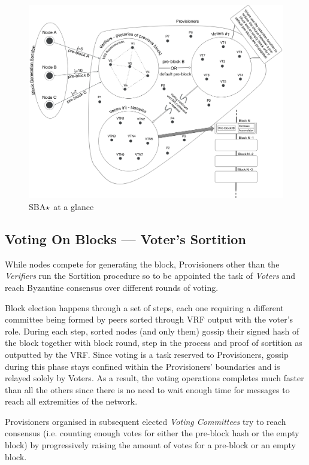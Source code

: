 \begin{figure}
\includegraphics[scale=0.2]{sba}
\caption{SBA$\large\star$ at a glance}
\end{figure}

\subsection{Voting On Blocks --- Voter's Sortition}

While nodes compete for generating the block, Provisioners other than
the \emph{Verifiers} run the Sortition procedure so to be appointed the
task of \emph{Voters} and reach Byzantine consensus over different
rounds of voting.

Block election happens through a set of steps, each
one requiring a different committee being formed by peers sorted through
VRF output with the voter's role. During each step, sorted nodes (and
only them) gossip their signed hash of the block together with block
round, step in the process and proof of sortition as outputted by the
VRF. Since voting is a task reserved to Provisioners, gossip during this
phase stays confined within the Provisioners' boundaries and is relayed
solely by Voters. As a result, the voting operations completes much
faster than all the others since there is no need to wait enough time
for messages to reach all extremities of the network.

Provisioners organised in subsequent elected \emph{Voting Committees} try to reach consensus (i.e. counting enough votes for either the pre-block hash or the empty block) by progressively raising the amount of votes for a pre-block or an empty block.

